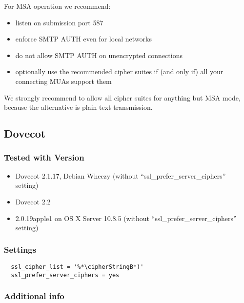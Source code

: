 For MSA operation we recommend:
\begin{itemize}
\item listen on submission port 587
\item enforce SMTP AUTH even for local networks
\item do not allow SMTP AUTH on unencrypted connections
\item optionally use the recommended cipher suites if (and only if) all your connecting MUAs support them
\end{itemize}




We strongly recommend to allow all cipher suites for anything but MSA
mode, because the alternative is plain text transmission.


\subsection{Dovecot}


\subsubsection{Tested with Version} 
\begin{itemize}
\item Dovecot 2.1.17, Debian Wheezy (without ``ssl\_prefer\_server\_ciphers'' setting)
\item Dovecot 2.2
\item 2.0.19apple1 on OS X Server 10.8.5 (without ``ssl\_prefer\_server\_ciphers'' setting)
\end{itemize}

\subsubsection{Settings}

\begin{lstlisting}
  ssl_cipher_list = '%*\cipherStringB*)'
  ssl_prefer_server_ciphers = yes
\end{lstlisting}

\subsubsection{Additional info}

